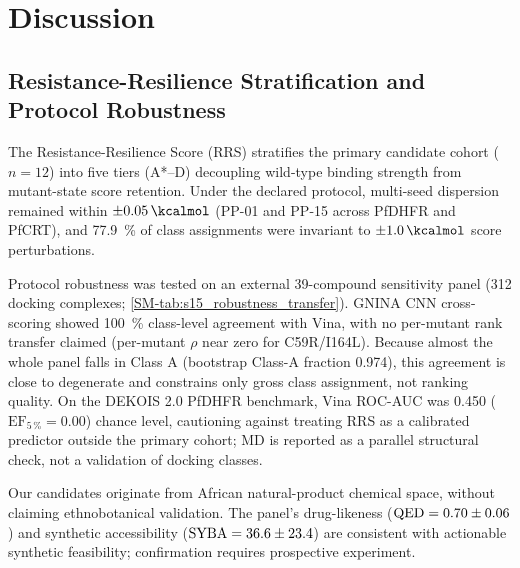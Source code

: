 \documentclass[11pt,a4paper]{article}
\begin{document}

\section{Discussion}

\subsection{Resistance-Resilience Stratification and Protocol Robustness}

The Resistance-Resilience Score (RRS) stratifies the primary candidate cohort ($n=\num{12}$) into five tiers (A*--D) decoupling wild-type binding strength from mutant-state score retention. Under the declared protocol, multi-seed dispersion remained within $\pm\qty{0.05}{\kcalmol}$ (PP-01 and PP-15 across PfDHFR and PfCRT), and \qty{77.9}{\percent} of class assignments were invariant to $\pm\qty{1.0}{\kcalmol}$ score perturbations.

Protocol robustness was tested on an external 39-compound sensitivity panel (\num{312} docking complexes; \cref{SM-tab:s15_robustness_transfer}). GNINA CNN cross-scoring showed \qty{100}{\percent} class-level agreement with Vina, with no per-mutant rank transfer claimed (per-mutant $\rho$ near zero for C59R/I164L). Because almost the whole panel falls in Class A (bootstrap Class-A fraction \num{0.974}), this agreement is close to degenerate and constrains only gross class assignment, not ranking quality. On the DEKOIS 2.0 PfDHFR benchmark, Vina ROC-AUC was \num{0.450} ($\mathrm{EF}_{5\,\%} = \num{0.00}$) chance level, cautioning against treating RRS as a calibrated predictor outside the primary cohort; MD is reported as a parallel structural check, not a validation of docking classes.

Our candidates originate from African natural-product chemical space, without claiming ethnobotanical validation. The panel's drug-likeness ($\mathrm{QED} = \num{0.70 \pm 0.06}$) and synthetic accessibility ($\mathrm{SYBA} = \num{36.6 \pm 23.4}$) are consistent with actionable synthetic feasibility; confirmation requires prospective experiment.
\end{document}
